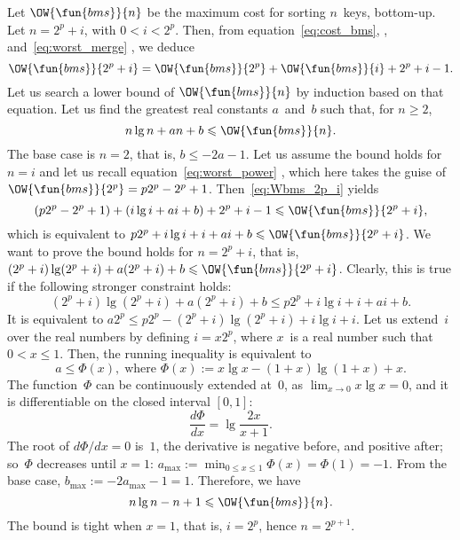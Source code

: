 Let \(\OW{\fun{bms}}{n}\) be the
maximum cost for sorting \(n\)~keys, bottom\hyp{}up. Let \(n=2^p+i\),
with \(0 < i < 2^p\). Then, from equation~\eqref{eq:cost_bms},
, and~\eqref{eq:worst_merge}
, we deduce
\begin{equation}
\OW{\fun{bms}}{2^p+i} = \OW{\fun{bms}}{2^p} + \OW{\fun{bms}}{i} + 2^p
+ i - 1.
\label{eq:Wbms_2p_i}
\end{equation}
Let us search a lower bound of \(\OW{\fun{bms}}{n}\) by induction
based on that equation. Let us find the greatest real constants
\(a\)~and~\(b\) such that, for \(n \geqslant 2\),
\begin{equation*}
n\lg n + an + b \leqslant \OW{\fun{bms}}{n}.
\end{equation*}
The base case is \(n=2\), that is, \(b \leqslant -2a - 1\). Let us
assume the bound holds for \(n=i\) and let us recall
equation~\eqref{eq:worst_power} , which here
takes the guise of \(\OW{\fun{bms}}{2^p} = p2^p - 2^p  +
1\). Then~\eqref{eq:Wbms_2p_i} yields
\begin{equation*}
(p2^p - 2^p + 1) + (i\lg i + ai + b) + 2^p + i - 1 \leqslant
\OW{\fun{bms}}{2^p+i},
\end{equation*}
which is equivalent to \(p2^p + i\lg i + i + ai + b \leqslant
\OW{\fun{bms}}{2^p+i}\). We want to prove the bound holds for
\(n=2^p+i\), that is, \((2^p+i)\lg(2^p+i) + a(2^p+i) + b \leqslant
\OW{\fun{bms}}{2^p+i}\). Clearly, this is true if the following
stronger constraint holds:
\begin{equation*}
(2^p+i)\lg(2^p+i) + a(2^p+i) + b \leqslant p2^p + i\lg i + i + ai + b.
\end{equation*}
It is equivalent to \(a2^p \leqslant p2^p - (2^p+i)\lg(2^p+i) + i\lg i
+ i\). Let us extend~\(i\) over the real numbers by defining \(i=x2^p\),
where \(x\)~is a real number such that \(0 < x \leqslant 1\). Then,
the running inequality is equivalent to
\begin{equation*}
a \leqslant \Phi(x),\; \text{where \(\Phi(x) := x\lg x -
  (1+x)\lg(1+x) + x\).}
\end{equation*}
The function~\(\Phi\) can be continuously extended at~\(0\), as
\(\lim_{x \to 0} x\lg x = 0\), and it is differentiable on the
closed interval \([0,1]\):
\begin{equation*}
\frac{d\Phi}{dx} = \lg\frac{2x}{x+1}.
\end{equation*}
The root of \(d\Phi/dx = 0\) is~\(1\), the derivative is negative
before, and positive after; so~\(\Phi\) decreases until \(x=1\):
\(a_{\max} := \min_{0 \leqslant x \leqslant 1}\Phi(x) = \Phi(1)
= -1\). From the base case, \(b_{\max} := -2a_{\max} - 1 =
1\). Therefore, we have
\begin{equation*}
n\lg n - n + 1 \leqslant \OW{\fun{bms}}{n}.
\end{equation*}
The bound is tight when \(x=1\), that is, \(i=2^p\), hence
\(n=2^{p+1}\).

